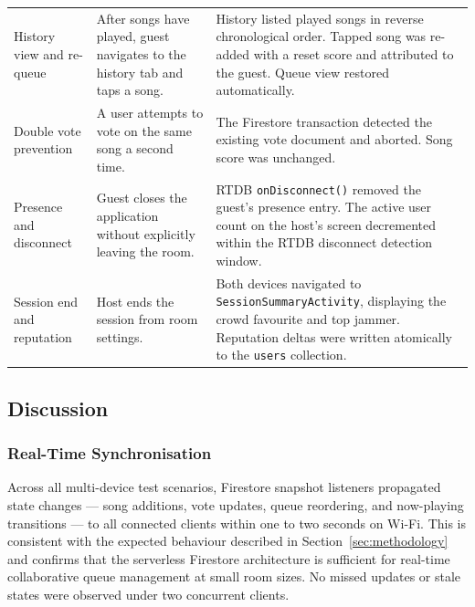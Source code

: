 \documentclass[pdflatex,sn-mathphys-num,iicol]{sn-jnl}
\theoremstyle{thmstyleone}%
\theoremstyle{thmstyletwo}%
\theoremstyle{thmstylethree}%
\begin{document}
\begin{table}[!ht]
\begin{tabular}{p{3.0cm} p{5.2cm} p{4.6cm}}
\addlinespace

History view and re-queue
& After songs have played, guest navigates to the history tab and taps a song.
& History listed played songs in reverse chronological order. Tapped song was
  re-added with a reset score and attributed to the guest. Queue view restored
  automatically. \\

\addlinespace

Double vote prevention
& A user attempts to vote on the same song a second time.
& The Firestore transaction detected the existing vote document and aborted.
  Song score was unchanged. \\

\addlinespace

Presence and disconnect
& Guest closes the application without explicitly leaving the room.
& RTDB \texttt{onDisconnect()} removed the guest's presence entry. The active
  user count on the host's screen decremented within the RTDB disconnect
  detection window. \\

\addlinespace

Session end and reputation
& Host ends the session from room settings.
& Both devices navigated to \texttt{SessionSummaryActivity}, displaying the
  crowd favourite and top jammer. Reputation deltas were written atomically to
  the \texttt{users} collection. \\

\bottomrule
\end{tabular}
\end{table}

\subsection{Discussion}

\subsubsection{Real-Time Synchronisation}

Across all multi-device test scenarios, Firestore snapshot listeners propagated
state changes — song additions, vote updates, queue reordering, and now-playing
transitions — to all connected clients within one to two seconds on Wi-Fi. This is
consistent with the expected behaviour described in Section~\ref{sec:methodology}
and confirms that the serverless Firestore architecture is sufficient for real-time
collaborative queue management at small room sizes. No missed updates or stale
states were observed under two concurrent clients.
\end{document}

